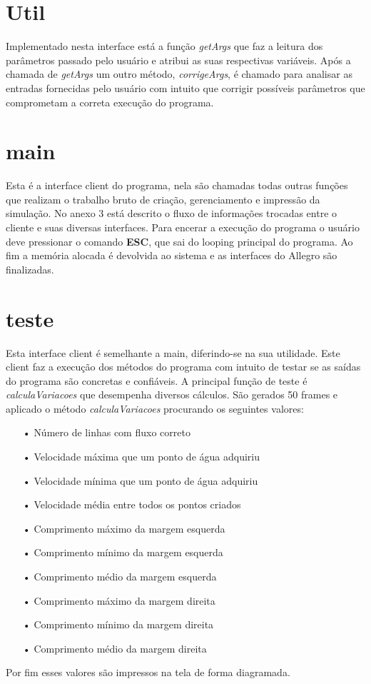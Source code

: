 \documentclass[a4paper,11pt]{article}
\begin{document}
\section{Util}
Implementado nesta interface está a fun\c{c}ão \textit{getArgs} que faz a leitura dos parâmetros passado pelo usuário e atribui as suas respectivas variáveis. Após a chamada de \textit{getArgs} um outro método, 
\textit{corrigeArgs}, é chamado para analisar as entradas fornecidas pelo usuário com intuito que corrigir possíveis parâmetros que comprometam a correta execu\c{c}ão do programa.

\section{main}
Esta é a interface client do programa, nela são chamadas todas outras fun\c{c}ões que realizam o trabalho bruto de cria\c{c}ão, gerenciamento e impressão da simula\c{c}ão. No anexo 3 está descrito o fluxo de informa\c{c}ões trocadas entre o cliente e suas diversas interfaces. Para encerar a execu\c{c}ão do programa o usuário deve pressionar o comando \textbf{ESC}, que sai do looping principal do programa. Ao fim a memória alocada é devolvida ao sistema e as interfaces do Allegro são finalizadas.

\section{teste}
Esta interface client é semelhante a main, diferindo-se na sua utilidade. Este client faz a execu\c{c}ão dos métodos do programa com intuito de testar se as saídas do programa são concretas e confiáveis. A principal fun\c{c}ão de teste é \textit{calculaVariacoes} que desempenha diversos cálculos. São gerados 50 frames e aplicado o método \textit{calculaVariacoes} procurando os seguintes valores:
\begin{enumerate}
\item[•]{Número de linhas com fluxo correto}
\item[•]{Velocidade máxima que um ponto de água adquiriu}
\item[•]{Velocidade mínima que um ponto de água adquiriu}
\item[•]{Velocidade média entre todos os pontos criados}
\item[•]{Comprimento máximo da margem esquerda}
\item[•]{Comprimento mínimo da margem esquerda}
\item[•]{Comprimento médio da margem esquerda}
\item[•]{Comprimento máximo da margem direita}
\item[•]{Comprimento mínimo da margem direita}
\item[•]{Comprimento médio da margem direita}
\end{enumerate}
Por fim esses valores são impressos na tela de forma diagramada.
\end{document}
